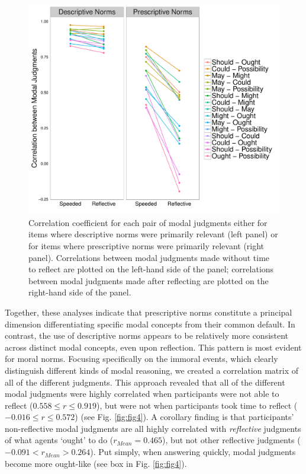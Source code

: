 \documentclass[9pt,twocolumn,twoside]{pnas-new}
\begin{document}
\begin{figure}%
\centering
\includegraphics[width=.9\linewidth]{fig3}
\caption{Correlation coefficient for each pair of modal judgments either for items where descriptive norms were primarily relevant (left panel) or for items where prescriptive norms were primarily relevant (right panel). Correlations between modal judgments made without time to reflect are plotted on the left-hand side of the panel; correlations between modal judgments made after reflecting are plotted on the right-hand side of the panel.}
\label{fig:fig3}
\end{figure}

Together, these analyses indicate that prescriptive norms constitute a principal dimension differentiating specific modal concepts from their common default. In contrast, the use of descriptive norms appears to be relatively more consistent across distinct modal concepts, even upon reflection. This pattern is most evident for moral norms. Focusing specifically on the immoral events, which clearly distinguish different kinds of modal reasoning, we created a correlation matrix of all of the different judgments. This approach revealed that all of the different modal judgments were highly correlated when participants were not able to reflect ($0.558 \leq r \leq 0.919$), but were not when participants took time to reflect ($-0.016 \leq r \leq 0.572$) (see Fig. \ref{fig:fig4}). A corollary finding is that participants' non-reflective modal judgments are all highly correlated with \textit{reflective} judgments of what agents `ought' to do ($r_{Mean} =0.465$), but not other reflective judgments ($ -0.091 < r_{Mean} > 0.264$). Put simply, when answering quickly, modal judgments become more ought-like (see box in Fig. \ref{fig:fig4}).
\end{document}
